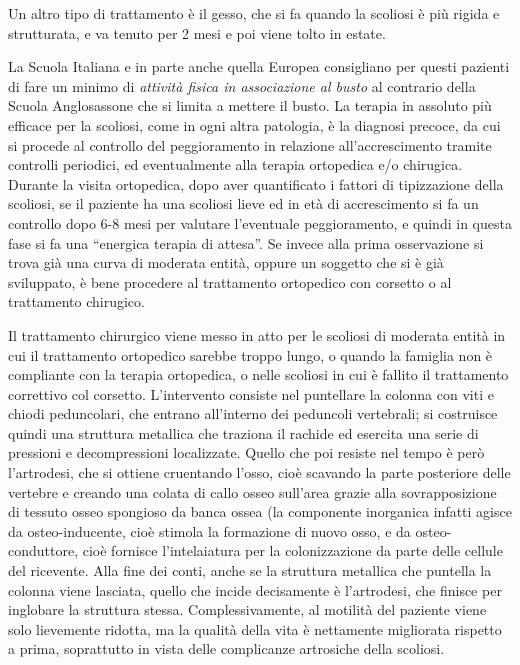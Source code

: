 \documentclass[]{article}
\begin{document}
Un altro tipo di trattamento è il gesso, che si fa quando la scoliosi è
più rigida e strutturata, e va tenuto per 2 mesi e poi viene tolto in
estate.

La Scuola Italiana e in parte anche quella Europea consigliano per
questi pazienti di fare un minimo di \emph{attività fisica in
associazione al busto} al contrario della Scuola Anglosassone che si
limita a mettere il busto. La terapia in assoluto più efficace per la
scoliosi, come in ogni altra patologia, è la diagnosi precoce, da cui si
procede al controllo del peggioramento in relazione all'accrescimento
tramite controlli periodici, ed eventualmente alla terapia ortopedica
e/o chirugica. Durante la visita ortopedica, dopo aver quantificato i
fattori di tipizzazione della scoliosi, se il paziente ha una scoliosi
lieve ed in età di accrescimento si fa un controllo dopo 6-8 mesi per
valutare l'eventuale peggioramento, e quindi in questa fase si fa una
``energica terapia di attesa''. Se invece alla prima osservazione si
trova già una curva di moderata entità, oppure un soggetto che si è già
sviluppato, è bene procedere al trattamento ortopedico con corsetto o al
trattamento chirugico.

Il trattamento chirurgico viene messo in atto per le scoliosi di
moderata entità in cui il trattamento ortopedico sarebbe troppo lungo, o
quando la famiglia non è compliante con la terapia ortopedica, o nelle
scoliosi in cui è fallito il trattamento correttivo col corsetto.
L'intervento consiste nel puntellare la colonna con viti e chiodi
peduncolari, che entrano all'interno dei peduncoli vertebrali; si
costruisce quindi una struttura metallica che traziona il rachide ed
esercita una serie di pressioni e decompressioni localizzate. Quello che
poi resiste nel tempo è però l'artrodesi, che si ottiene cruentando
l'osso, cioè scavando la parte posteriore delle vertebre e creando una
colata di callo osseo sull'area grazie alla sovrapposizione di tessuto
osseo spongioso da banca ossea (la componente inorganica infatti agisce
da osteo-inducente, cioè stimola la formazione di nuovo osso, e da
osteo-conduttore, cioè fornisce l'intelaiatura per la colonizzazione da
parte delle cellule del ricevente. Alla fine dei conti, anche se la
struttura metallica che puntella la colonna viene lasciata, quello che
incide decisamente è l'artrodesi, che finisce per inglobare la struttura
stessa. Complessivamente, al motilità del paziente viene solo lievemente
ridotta, ma la qualità della vita è nettamente migliorata rispetto a
prima, soprattutto in vista delle complicanze artrosiche della scoliosi.
\end{document}

